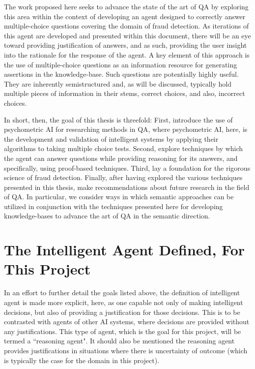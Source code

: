 The work proposed here seeks to advance the state of the art of QA by exploring 
this area within the context of developing an agent designed to correctly answer multiple-choice 
questions covering the domain of fraud detection.  As iterations of this agent are developed and presented
within this document, there will be an eye toward providing justification of answers, and as such, 
providing the user insight into the rationale for the response of the agent. A key element of this approach is the use of multiple-choice questions as an information
resource for generating assertions in the knowledge-base.  Such questions are potentially highly useful.  They are inherently semistructured and, as will be discussed, typically hold multiple pieces of information
in their stems, correct choices, and also, incorrect choices.

In short, then, the goal of this thesis is threefold:  First, introduce the use of psychometric AI \cite{bringsjord_schimanski_2004, psychoai.ijcai03} for 
researching methods in QA, where psychometric AI, here, is the  
development and validation of intelligent systems by applying their algorithms to taking multiple
choice tests.  Second, explore techniques by which the agent can answer questions while providing
reasoning for its answers, and specifically, using proof-based techniques.  Third, lay a foundation
for the rigorous science of fraud detection.  Finally, after having explored the various techniques 
presented in this thesis, make recommendations about future research in the field of QA.
In particular, we consider ways in which semantic approaches can be utilized in conjunction with 
the techniques presented here for developing knowledge-bases to advance the art of QA in the 
semantic direction.

\section{The Intelligent Agent Defined, For This Project}
In an effort to further detail the goals listed above, the definition of intelligent agent is made 
more explicit, here, as one capable not only of making intelligent decisions, but also of 
providing a justification for those decisions.  This is to be contrasted with agents of other 
AI \cite{Russell:2003:AIM:773294} systems, where decisions are provided without any justifications.  This type of agent, which
is the goal for this project, will be termed a ``reasoning agent".  It should also be mentioned the 
reasoning agent provides justifications in situations where there is uncertainty of outcome (which is 
typically the case for the domain in this project).

